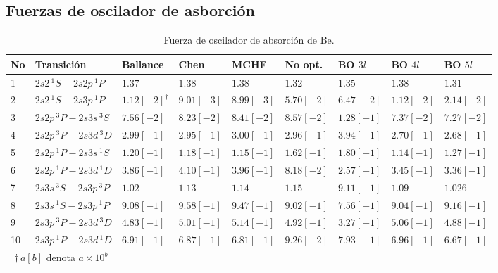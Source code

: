 \newpage
\subsection{Fuerzas de oscilador de asborción}

\begin{table}
\begin{adjustwidth}{-.6in}{-.6in}  
\centering
\begin{tabular}{|lllllllll|} 
\hline 
No & Transición               & Ballance   & Chen       & MCHF       & No opt.    & BO $3l$    & BO $4l$  & BO $5l$ \\
\hline
\hline
1 & $2s2  \,^1S - 2s2p \,^1P$ & $1.37$ & $1.38$ & $1.38    $ & $1.32    $ & $1.35    $ & $1.38    $ & $1.31$ \\
2 & $2s2  \,^1S - 2s3p \,^1P$ & $1.12[-2]^\dagger$ & $9.01[-3]$ & $8.99[-3]$ & $5.70[-2]$ & $6.47[-2]$ & $1.12[-2]$ & $2.14[-2]$ \\
3 & $2s2p \,^3P - 2s3s \,^3S$ & $7.56[-2]$ & $8.23[-2]$ & $8.41[-2]$ & $8.57[-2]$ & $1.28[-1]$ & $7.37[-2]$ & $7.27[-2]$ \\
4 & $2s2p \,^3P - 2s3d \,^3D$ & $2.99[-1]$ & $2.95[-1]$ & $3.00[-1]$ & $2.96[-1]$ & $3.94[-1]$ & $2.70[-1]$ & $2.68[-1]$ \\
5 & $2s2p \,^1P - 2s3s \,^1S$ & $1.20[-1]$ & $1.18[-1]$ & $1.15[-1]$ & $1.62[-1]$ & $1.80[-1]$ & $1.14[-1]$ & $1.27[-1]$ \\
6 & $2s2p \,^1P - 2s3d \,^1D$ & $3.86[-1]$ & $4.10[-1]$ & $3.96[-1]$ & $8.18[-2]$ & $2.57[-1]$ & $3.45[-1]$ & $3.36[-1]$ \\
7 & $2s3s \,^3S - 2s3p \,^3P$ & $1.02$     & $1.13    $ & $1.14    $ & $1.15    $ & $9.11[-1]$ & $1.09    $ & $1.026$ \\
8 & $2s3s \,^1S - 2s3p \,^1P$ & $9.08[-1]$ & $9.58[-1]$ & $9.47[-1]$ & $9.02[-1]$ & $7.56[-1]$ & $9.04[-1]$ & $9.16[-1]$ \\
9 & $2s3p \,^3P - 2s3d \,^3D$ & $4.83[-1]$ & $5.01[-1]$ & $5.14[-1]$ & $4.92[-1]$ & $3.27[-1]$ & $5.06[-1]$ & $4.88[-1]$ \\
10 & $2s3p \,^1P - 2s3d \,^1D$ & $6.91[-1]$ & $6.87[-1]$ & $6.81[-1]$ & $9.26[-2]$ & $7.93[-1]$ & $6.96[-1]$ & $6.67[-1]$ \\
\hline
\multicolumn{2}{c}{$\dagger\,a[b]$ denota $a\times 10^b$} \\
\end{tabular}
\caption{Fuerza de oscilador de absorción de Be.}
\label{tab:fabs}
\end{adjustwidth}
\end{table}


